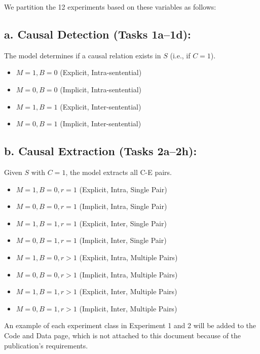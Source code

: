 \documentclass[conference]{IEEEtran}
\newcommand{\sun}[1]{\textcolor{blue}{[SC: #1]}}
\begin{document}
We partition the 12 experiments based on these variables as follows:

\subsection*{a. Causal Detection (Tasks 1a--1d):}
The model determines if a causal relation exists in $S$ (i.e., if $C=1$).

\begin{itemize}[leftmargin=*,labelwidth=2em,align=left]
    \item[\textbf{1a:}] $M=1, B=0$ (Explicit, Intra-sentential)
    \item[\textbf{1b:}] $M=0, B=0$ (Implicit, Intra-sentential)
    \item[\textbf{1c:}] $M=1, B=1$ (Explicit, Inter-sentential)
    \item[\textbf{1d:}] $M=0, B=1$ (Implicit, Inter-sentential)
\end{itemize}

\subsection*{b. Causal Extraction (Tasks 2a--2h):}
Given $S$ with $C=1$, the model extracts all C-E pairs.

\begin{itemize}[leftmargin=*,labelwidth=2em,align=left]
    \item[\textbf{2a:}] $M=1, B=0, r=1$ (Explicit, Intra, Single Pair)
    \item[\textbf{2b:}] $M=0, B=0, r=1$ (Implicit, Intra, Single Pair)
    \item[\textbf{2c:}] $M=1, B=1, r=1$ (Explicit, Inter, Single Pair)
    \item[\textbf{2d:}] $M=0, B=1, r=1$ (Implicit, Inter, Single Pair)
    \item[\textbf{2e:}] $M=1, B=0, r>1$ (Explicit, Intra, Multiple Pairs)
    \item[\textbf{2f:}] $M=0, B=0, r>1$ (Implicit, Intra, Multiple Pairs)
    \item[\textbf{2g:}] $M=1, B=1, r>1$ (Explicit, Inter, Multiple Pairs)
    \item[\textbf{2h:}] $M=0, B=1, r>1$ (Implicit, Inter, Multiple Pairs)
\end{itemize}





An example of each experiment class in Experiment 1 and 2 will be added to the Code and Data page, which is not attached to this document because of the publication's requirements.
\end{document}
